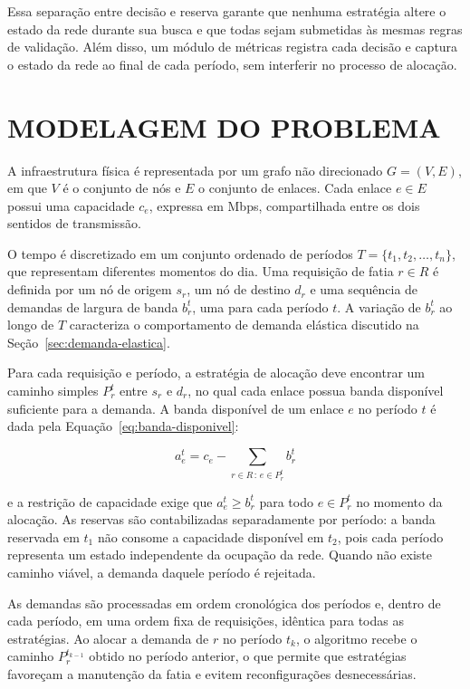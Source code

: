 Essa separação entre decisão e reserva garante que nenhuma estratégia altere o estado da rede durante sua busca e que todas sejam submetidas às mesmas regras de validação. Além disso, um módulo de métricas registra cada decisão e captura o estado da rede ao final de cada período, sem interferir no processo de alocação.

\section{MODELAGEM DO PROBLEMA}
\label{sec:modelo}

A infraestrutura física é representada por um grafo não direcionado $G = (V, E)$, em que $V$ é o conjunto de nós e $E$ o conjunto de enlaces. Cada enlace $e \in E$ possui uma capacidade $c_e$, expressa em Mbps, compartilhada entre os dois sentidos de transmissão.

O tempo é discretizado em um conjunto ordenado de períodos $T = \{t_1, t_2, \ldots, t_n\}$, que representam diferentes momentos do dia. Uma requisição de fatia $r \in R$ é definida por um nó de origem $s_r$, um nó de destino $d_r$ e uma sequência de demandas de largura de banda $b_r^t$, uma para cada período $t$. A variação de $b_r^t$ ao longo de $T$ caracteriza o comportamento de demanda elástica discutido na Seção~\ref{sec:demanda-elastica}. %

Para cada requisição e período, a estratégia de alocação deve encontrar um caminho simples $P_r^t$ entre $s_r$ e $d_r$, no qual cada enlace possua banda disponível suficiente para a demanda. A banda disponível de um enlace $e$ no período $t$ é dada pela Equação~\ref{eq:banda-disponivel}:

\begin{equation}
    a_e^t = c_e - \sum_{r \in R \,:\, e \in P_r^t} b_r^t
    \label{eq:banda-disponivel}
\end{equation}

\noindent e a restrição de capacidade exige que $a_e^t \geq b_r^t$ para todo $e \in P_r^t$ no momento da alocação. As reservas são contabilizadas separadamente por período: a banda reservada em $t_1$ não consome a capacidade disponível em $t_2$, pois cada período representa um estado independente da ocupação da rede. Quando não existe caminho viável, a demanda daquele período é rejeitada.

As demandas são processadas em ordem cronológica dos períodos e, dentro de cada período, em uma ordem fixa de requisições, idêntica para todas as estratégias. Ao alocar a demanda de $r$ no período $t_k$, o algoritmo recebe o caminho $P_r^{t_{k-1}}$ obtido no período anterior, o que permite que estratégias favoreçam a manutenção da fatia e evitem reconfigurações desnecessárias.

